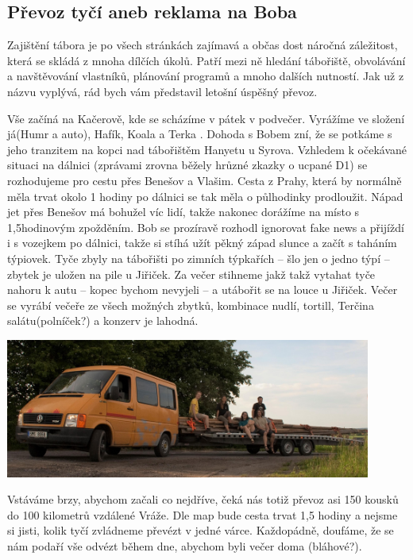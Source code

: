 \subsection*{Převoz tyčí aneb reklama na Boba}
\label{sub:převoz_tyčí_aneb_reklama_na_Boba}

Zajištění tábora je po všech stránkách zajímavá a občas dost náročná záležitost, která se skládá z mnoha dílčích úkolů. Patří mezi ně hledání tábořiště, obvolávání a navštěvování vlastníků, plánování programů a mnoho dalších nutností. Jak už z názvu vyplývá, rád bych vám představil letošní úspěšný převoz.

Vše začíná na Kačerově, kde se scházíme v pátek v podvečer. Vyrážíme ve složení já(Humr a auto), Hafík, Koala a Terka . Dohoda s Bobem zní, že se potkáme s jeho tranzitem na kopci nad tábořištěm Hanyetu u Syrova. Vzhledem k očekávané situaci na dálnici (zprávami zrovna běžely hrůzné zkazky o ucpané D1) se rozhodujeme pro cestu přes Benešov a Vlašim. Cesta z Prahy, která by normálně měla trvat okolo 1 hodiny po dálnici se tak měla o půlhodinky prodloužit. Nápad jet přes Benešov má bohužel víc lidí, takže nakonec dorážíme na místo s 1,5hodinovým zpožděním. Bob se prozíravě rozhodl ignorovat fake news a přijíždí i s vozejkem po dálnici, takže si stíhá užít pěkný západ slunce a začít s taháním týpiovek. Tyče zbyly na tábořišti po zimních týpkařích – šlo jen o jedno týpí – zbytek je uložen na pile u Jiřiček. Za večer stihneme jakž takž vytahat tyče nahoru k autu – kopec bychom nevyjeli – a utábořit se na louce u Jiřiček. Večer se vyrábí večeře ze všech možných zbytků, kombinace nudlí, tortill, Terčina salátu(polníček?) a konzerv je lahodná.



\begin{center}

\includegraphics[width=12cm]{img/udo_clanky/Prevoz_tyci_2019_010.jpg}
\end{center}

Vstáváme brzy, abychom začali co nejdříve, čeká nás totiž převoz asi 150 kousků do 100 kilometrů vzdálené Vráže. Dle map bude cesta trvat 1,5 hodiny a nejsme si jisti, kolik tyčí zvládneme převézt v jedné várce. Každopádně, doufáme, že se nám podaří vše odvézt během dne, abychom byli večer doma (bláhové?).

